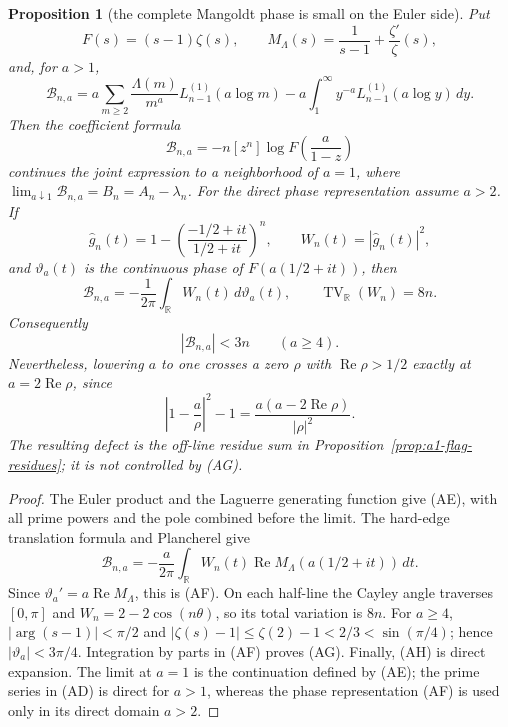 \documentclass[11pt]{amsart}
\newtheorem{proposition}[theorem]{Proposition}
\theoremstyle{definition}
\theoremstyle{remark}
\theoremstyle{definition}
\renewcommand{\Re}{\operatorname{Re}}
\begin{document}
\begin{proposition}[the complete Mangoldt phase is small on the Euler side]
\label{prop:a1-full-mangoldt-phase}
Put
\[
 F(s)=(s-1)\zeta(s),\qquad
 M_\Lambda(s)=\frac1{s-1}+\frac{\zeta'}\zeta(s),
\]
and, for $a>1$,
\[
 \mathcal B_{n,a}
 =a\sum_{m\ge2}\frac{\Lambda(m)}{m^a}
       L_{n-1}^{(1)}(a\log m)
 -a\int_1^\infty y^{-a}L_{n-1}^{(1)}(a\log y)\,dy .       \tag{AD}
\]
Then the coefficient formula
\[
 \mathcal B_{n,a}=-n[z^n]\log F\!\left(\frac a{1-z}\right) \tag{AE}
\]
continues the joint expression to a neighborhood of $a=1$, where
$\lim_{a\downarrow1}\mathcal B_{n,a}=B_n=A_n-\lambda_n$.
For the direct phase representation assume $a>2$.  If
\[
 \widehat g_n(t)=1-\left(\frac{-1/2+it}{1/2+it}\right)^n,
 \qquad W_n(t)=|\widehat g_n(t)|^2,
\]
and $\vartheta_a(t)$ is the continuous phase of
$F(a(1/2+it))$, then
\[
 \mathcal B_{n,a}
 =-\frac1{2\pi}\int_{\mathbb R}W_n(t)\,d\vartheta_a(t),
 \qquad \operatorname {TV}_{\mathbb R}(W_n)=8n.             \tag{AF}
\]
Consequently
\[
 \boxed{|\mathcal B_{n,a}|<3n\qquad(a\ge4).}               \tag{AG}
\]
Nevertheless, lowering $a$ to one crosses a zero $\rho$ with
$\Re\rho>1/2$ exactly at $a=2\Re\rho$, since
\[
 \left|1-\frac a\rho\right|^2-1
 =\frac{a(a-2\Re\rho)}{|\rho|^2}.                          \tag{AH}
\]
The resulting defect is the off-line residue sum in
Proposition~\ref{prop:a1-flag-residues}; it is not controlled by (AG).
\end{proposition}

\begin{proof}
The Euler product and the Laguerre generating function give (AE), with
all prime powers and the pole combined before the limit.  The hard-edge
translation formula and Plancherel give
\[
 \mathcal B_{n,a}=-\frac a{2\pi}\int_{\mathbb R}W_n(t)
      \Re M_\Lambda(a(1/2+it))\,dt.
\]
Since $\vartheta_a'=a\Re M_\Lambda$, this is (AF).  On each half-line the
Cayley angle traverses $[0,\pi]$ and
$W_n=2-2\cos(n\theta)$, so its total variation is $8n$.
For $a\ge4$, $|\arg(s-1)|<\pi/2$ and
$|\zeta(s)-1|\le\zeta(2)-1<2/3<\sin(\pi/4)$; hence
$|\vartheta_a|<3\pi/4$.  Integration by parts in (AF) proves (AG).
Finally, (AH) is direct expansion.  The limit at $a=1$ is the continuation
defined by (AE); the prime series in (AD) is direct for $a>1$, whereas the
phase representation (AF) is used only in its direct domain $a>2$.
\end{proof}
\end{document}
